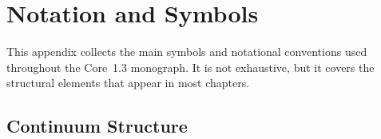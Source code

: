 
\section{Notation and Symbols}
\label{app:notation}

This appendix collects the main symbols and notational conventions used
throughout the Core~1.3 monograph.  It is not exhaustive, but it covers the
structural elements that appear in most chapters.

\subsection{Continuum Structure}


